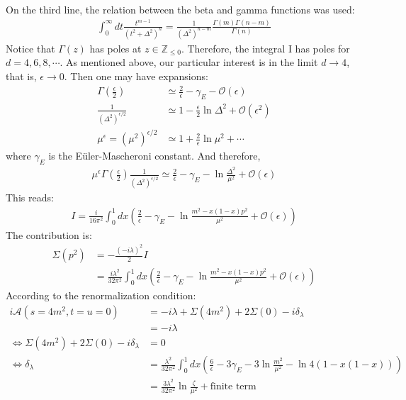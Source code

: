 \documentclass[fleqn]{article}
\begin{document}
On the third line, the relation between the beta and gamma functions was used:
\begin{align}
\int _{0}^{\infty} dt \frac{t^{m-1}}{(t^{2}+\Delta^{2})^{n}} = \frac{1}{(\Delta^{2})^{n-m}}\frac{\Gamma(m)\Gamma(n-m)}{\Gamma(n)}
\end{align}
Notice that $\Gamma(z)$ has poles at $z \in \mathbb{Z}_{\leq 0}$. Therefore, the integral I has poles for $d= 4,6,8,\cdots$. As mentioned above, our particular interest is in the limit $d \rightarrow 4$, that is, $\epsilon \rightarrow 0$. Then one may have expansions:
\begin{align}
\Gamma(\frac{\epsilon}{2}) &\simeq \frac{2}{\epsilon} - \gamma_{E} - \mathcal{O(\epsilon)} \\
\frac{1}{(\Delta^{2})^{\epsilon /2}} &\simeq 1 -\frac{\epsilon}{2} \ln \Delta ^{2} + \mathcal{O}(\epsilon ^{2})\\
\mu^{\epsilon} = (\mu^{2})^{\epsilon /2} &\simeq 1 + \frac{2}{\epsilon}\ln \mu^{2} + \cdots
\end{align}
where $\gamma_{E}$ is the Eüler-Mascheroni constant. And therefore,
\begin{align}
\mu^{\epsilon}\Gamma(\frac{\epsilon}{2})\frac{1}{(\Delta^{2})^{\epsilon /2}} \simeq \frac{2}{\epsilon} - \gamma_{E} - \ln \frac{\Delta ^{2}}{\mu^{2}} + \mathcal{O}(\epsilon)
\end{align}
This reads:
\begin{align}
I = \frac{i}{16\pi ^{2}} \int_{0}^{1} dx (\frac{2}{\epsilon} - \gamma_{E} - \ln \frac{m^{2} - x(1-x)p^{2}}{\mu^{2}} + \mathcal{O}(\epsilon))
\end{align}
The contribution is:
\begin{align}
\Sigma(p^{2}) &= -\frac{(-i\lambda)^{2}}{2}I \nonumber \\
&= \frac{i\lambda^{2}}{32\pi ^{2}} \int_{0}^{1} dx (\frac{2}{\epsilon} - \gamma_{E} - \ln \frac{m^{2} - x(1-x)p^{2}}{\mu^{2}} + \mathcal{O}(\epsilon))
\end{align}
According to the renormalization condition:
\begin{align}
i\mathcal{A}(s= 4m^{2}, t=u=0) &= -i\lambda + \Sigma(4m^{2}) + 2\Sigma(0) - i\delta_{\lambda} \nonumber \\
&= -i\lambda \nonumber \\
\Leftrightarrow \Sigma(4m^{2}) + 2\Sigma(0) -i\delta_{\lambda} &= 0 \nonumber \\
\Leftrightarrow \delta _{\lambda} &= \frac{\lambda^{2}}{32\pi^{2}} \int_{0}^{1} dx (\frac{6}{\epsilon} - 3\gamma_{E} -3 \ln \frac{m^{2}}{\mu^{2}} - \ln 4(1-x(1-x))) \nonumber \\
&= \frac{3\lambda^{2}}{32\pi^{2}} \ln\frac{\zeta}{\mu^{2}} + \text{finite term}
\end{align}
\end{document}

